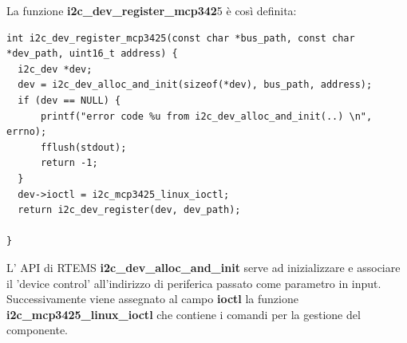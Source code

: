 \documentclass[12pt, a4paper, titlepage, oneside]{book}
\begin{document}
La funzione \textbf{i2c\_dev\_register\_mcp342}5 è così definita:
\begin{lstlisting}[style = CStyle]
int i2c_dev_register_mcp3425(const char *bus_path, const char *dev_path, uint16_t address) {
  i2c_dev *dev;
  dev = i2c_dev_alloc_and_init(sizeof(*dev), bus_path, address);
  if (dev == NULL) {
	  printf("error code %u from i2c_dev_alloc_and_init(..) \n", errno);
	  fflush(stdout);
	  return -1;
  }
  dev->ioctl = i2c_mcp3425_linux_ioctl;
  return i2c_dev_register(dev, dev_path);

}
\end{lstlisting}
L' API di RTEMS \textbf{i2c\_dev\_alloc\_and\_init} serve ad inizializzare e associare il 'device control' all'indirizzo di periferica passato come parametro in input. Successivamente viene assegnato al campo \textbf{ioctl} la funzione \textbf{i2c\_mcp3425\_linux\_ioctl} che contiene i comandi per la gestione del componente.
\end{document}
